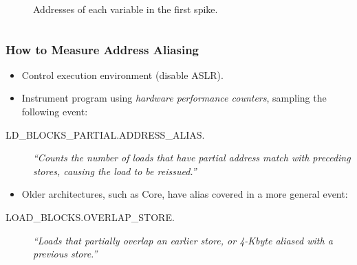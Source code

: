 \documentclass{beamer}
\begin{document}
\begin{frame}
\begin{columns}[T]
\begin{column}{.50\textwidth}
\begin{figure}
\begin{tikzpicture}[font=\footnotesize]

  \end{tikzpicture}
  \caption{Addresses of each variable in the first spike.}
\end{figure}


\end{column}
\end{columns}

\end{frame}


\begin{frame}[fragile]
  \frametitle{How to Measure Address Aliasing}

  \begin{itemize}
    \item Control execution environment (disable ASLR).
    \item Instrument program using \emph{hardware performance counters}, sampling the following event:
  \end{itemize}

  \begin{description}
    \item[{\small LD\_BLOCKS\_PARTIAL.ADDRESS\_ALIAS.}] 
    \emph{``Counts the number of loads that have partial address match with preceding stores, causing the load to be reissued.''} 
    \cite[B.3.4.4]{OptimizationManual}
  \end{description}

  \begin{itemize}
    \item Older architectures, such as Core, have alias covered in a more general event:
  \end{itemize}

  \begin{description}
    \item[{\small LOAD\_BLOCKS.OVERLAP\_STORE.}] 
    \emph{``Loads that partially overlap an earlier store, or 4-Kbyte aliased with a previous store.''} 
    \cite[Table 19-17]{Volume3B}
  \end{description}

\end{frame}
\end{document}
